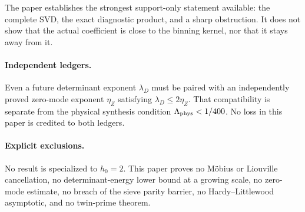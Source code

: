 \documentclass[11pt,a4paper]{article}
\theoremstyle{definition}
\theoremstyle{remark}
\begin{document}
The paper establishes the strongest support-only statement available:
the complete SVD, the exact diagnostic product, and a sharp
obstruction.  It does not show that the actual coefficient is close
to the binning kernel, nor that it stays away from it.

\paragraph{Independent ledgers.}
Even a future determinant exponent \(\lambda_D\) must be paired with
an independently proved zero-mode exponent \(\eta_Z\) satisfying
\(\lambda_D\le2\eta_Z\).  That compatibility is separate from the
physical synthesis condition
\(\Lambda_{\rm phys}<1/400\).  No loss in this paper is credited to
both ledgers.

\paragraph{Explicit exclusions.}
No result is specialized to \(h_0=2\).  This paper proves no
M\"obius or Liouville cancellation, no determinant-energy lower
bound at a growing scale, no zero-mode estimate, no breach of the
sieve parity barrier, no Hardy--Littlewood asymptotic, and no
twin-prime theorem.

\begingroup
\sloppy


\endgroup
\end{document}
